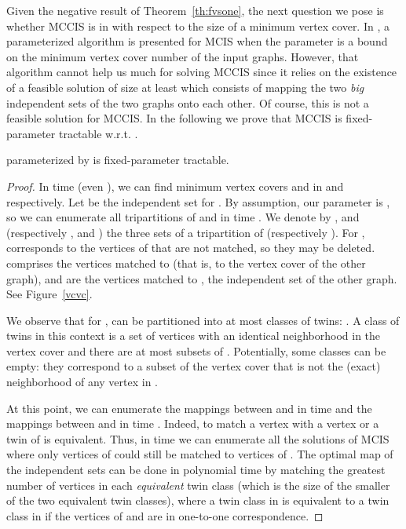 \medskip











Given the negative result of Theorem~\ref{th:fvsone}, the next question we pose is whether MCCIS is in  with respect to the size of a minimum vertex cover. 
In \cite{AbuKhzam2014}, a parameterized algorithm is presented for MCIS when the parameter is a bound on the minimum vertex cover number of the input graphs.
However, that algorithm cannot help us much for solving MCCIS since it relies on the existence of a feasible solution of size at least  which consists of mapping the two \emph{big} independent sets of the two graphs onto each other.
Of course, this is not a feasible solution for MCCIS.
In the following we prove that MCCIS is fixed-parameter tractable w.r.t. .



\begin{theorem}
\label{mccis_vc}
\mccis parameterized by  is fixed-parameter tractable.
\end{theorem}


\begin{proof}
In time  (even  \cite{CKX10}), we can find minimum vertex covers  and  in  and  respectively.
Let  be the independent set  for .
By assumption, our parameter  is , so we can enumerate all tripartitions of  and  in time .
We denote by ,  and  (respectively ,  and ) the three sets of a tripartition of  (respectively ).
For ,  corresponds to the vertices of  that are not matched, so they may be deleted.
 comprises the vertices matched to  (that is, to the vertex cover of the other graph), and  are the vertices matched to , the independent set of the other graph. See Figure~\ref{vcvc}.

We observe that for ,  can be partitioned into at most  classes of twins: . A class of twins in this context is a set of vertices with an identical neighborhood in the vertex cover and there are at most  subsets of . Potentially, some classes can be empty: they correspond to a subset of the vertex cover  that is not the (exact) neighborhood of any vertex in .

At this point, we can enumerate the mappings between  and  in time  and the mappings between  and  in time .
Indeed, to match a vertex  with a vertex  or a twin of  is equivalent.
Thus, in time  we can enumerate all the solutions of MCIS where only vertices of  could still be matched to vertices of .
The optimal map of the independent sets can be done in polynomial time by matching the greatest number of vertices in each \emph{equivalent} twin class (which is the size of the smaller of the two equivalent twin classes), where a twin class  in  is equivalent to a twin class  in  if the vertices of  and  are in one-to-one correspondence.
\end{proof}

